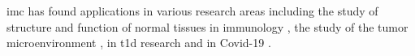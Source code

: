\par \gls{imc} has found applications in various research areas including the study of structure and function of normal tissues \textbf{\cite{chang_imaging_2017}} in immunology \textbf{\cite{zhao_spatiotemporal_2018,li_memory_2019}}, the study of the tumor microenvironment \textbf{\cite{jackson_single-cell_2020,moldoveanu_spatially_2022}}, in \gls{t1d} research \textbf{\cite{damond_map_2019,wang_multiplexed_2019}} and in Covid-19 \textbf{\cite{wang_imaging_2020}}. 




